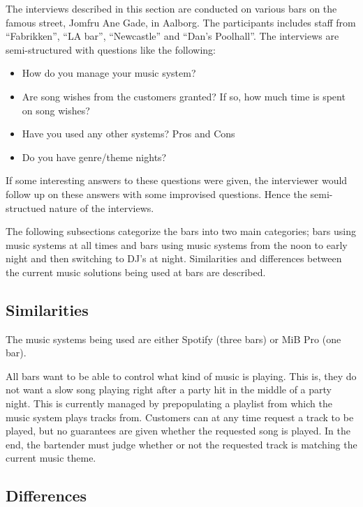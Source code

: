 \label{interviews}
The interviews described in this section are conducted on various bars on the famous street, Jomfru Ane Gade, in Aalborg. The participants includes staff from \enquote{Fabrikken}, \enquote{LA bar}, \enquote{Newcastle} and \enquote{Dan's Poolhall}. The interviews are semi-structured with questions like the following:

\begin{itemize}
  \item How do you manage your music system?
  \item Are song wishes from the customers granted? If so, how much time is spent on song wishes?
  \item Have you used any other systems? Pros and Cons
  \item Do you have genre/theme nights?
\end{itemize}

If some interesting answers to these questions were given, the interviewer would follow up on these answers with some improvised questions. Hence the semi-structued nature of the interviews.

The following subsections categorize the bars into two main categories; bars using music systems at all times and bars using music systems from the noon to early night and then switching to DJ's at night. Similarities and differences between the current music solutions being used at bars are described.

\subsection{Similarities}
\label{sub:similarities}

The music systems being used are either Spotify (three bars) or MiB Pro (one bar).

All bars want to be able to control what kind of music is playing. This is, they do not want a slow song playing right after a party hit in the middle of a party night. This is currently managed by prepopulating a playlist from which the music system plays tracks from. Customers can at any time request a track to be played, but no guarantees are given whether the requested song is played. In the end, the bartender must judge whether or not the requested track is matching the current music theme.


\subsection{Differences}
\label{sub:differences}


